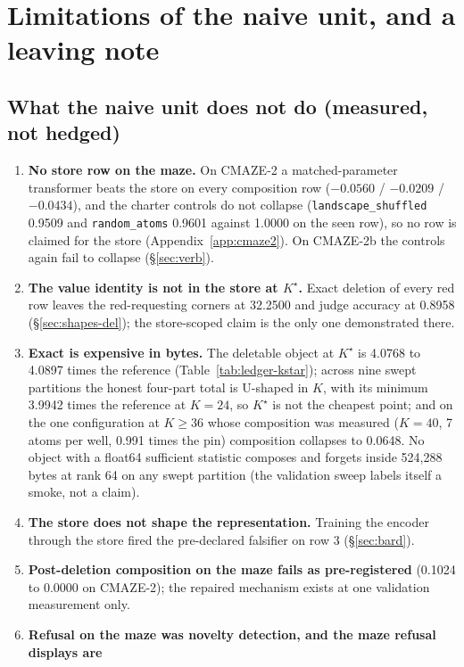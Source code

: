 \documentclass{article}
\newcommand{\Kstar}{\ensuremath{K^{\star}}}
\begin{document}
\section{Limitations of the naive unit, and a leaving note}
\label{sec:limits}

\subsection{What the naive unit does not do (measured, not hedged)}
\label{sec:limits-list}

\begin{enumerate}[leftmargin=*,itemsep=1pt]
\item \textbf{No store row on the maze.} On CMAZE-2 a matched-parameter transformer beats the
  store on every composition row ($-0.0560$ / $-0.0209$ / $-0.0434$), and the charter controls do
  not collapse (\texttt{landscape\_shuffled} 0.9509 and \texttt{random\_atoms} 0.9601 against
  1.0000 on the seen row), so no row is claimed for the store (Appendix~\ref{app:cmaze2}). On
  CMAZE-2b the controls again fail to collapse (\S\ref{sec:verb}).
\item \textbf{The value identity is not in the store at $\Kstar$.} Exact deletion of every red
  row leaves the red-requesting corners at 32.2500 and judge accuracy at 0.8958
  (\S\ref{sec:shapes-del}); the store-scoped claim is the only one demonstrated there.
\item \textbf{Exact is expensive in bytes.} The deletable object at $\Kstar$ is 4.0768 to 4.0897
  times the reference (Table~\ref{tab:ledger-kstar}); across nine swept partitions the honest
  four-part total is U-shaped in $K$, with its minimum 3.9942 times the reference at $K=24$, so
  $\Kstar$ is not the cheapest point; and on the one configuration at $K\ge36$ whose composition
  was measured ($K=40$, 7 atoms per well, 0.991 times the pin) composition collapses to 0.0648.
  No object with a float64 sufficient statistic composes and forgets inside 524,288 bytes at rank
  64 on any swept partition (the validation sweep labels itself a smoke, not a claim).
\item \textbf{The store does not shape the representation.} Training the encoder through the
  store fired the pre-declared falsifier on row 3 (\S\ref{sec:bard}).
\item \textbf{Post-deletion composition on the maze fails as pre-registered} (0.1024 to 0.0000
  on CMAZE-2); the repaired mechanism exists at one validation measurement only.
\item \textbf{Refusal on the maze was novelty detection, and the maze refusal displays are
}
\end{enumerate}
\end{document}

